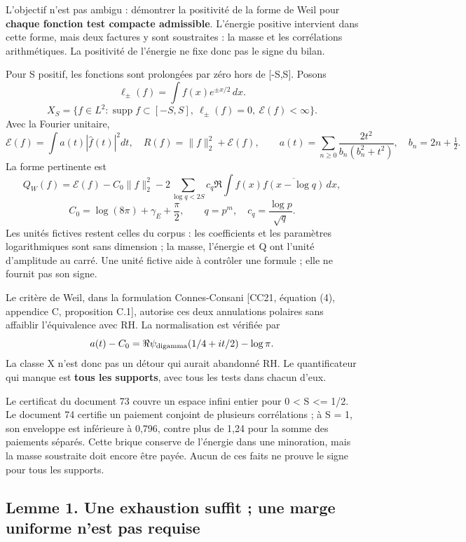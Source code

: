 \documentclass[
  10pt,
  a4paper,
]{article}
\begin{document}
L'objectif n'est pas ambigu : démontrer la positivité de la forme de
Weil pour \textbf{chaque fonction test compacte admissible}. L'énergie
positive intervient dans cette forme, mais deux factures y sont
soustraites : la masse et les corrélations arithmétiques. La positivité
de l'énergie ne fixe donc pas le signe du bilan.

Pour S positif, les fonctions sont prolongées par zéro hors de
{[}-S,S{]}. Posons \[
\ell_\pm(f)=\int f(x)e^{\pm x/2}\,dx.
\] \[
X_S=\{f\in L^2:\operatorname{supp}f\subset[-S,S],\ \ell_\pm(f)=0,\ \mathcal E(f)<\infty\}.
\] Avec la Fourier unitaire, \[
\mathcal E(f)=\int a(t)|\widehat f(t)|^2dt,\quad
R(f)=\|f\|_2^2+\mathcal E(f),\qquad
a(t)=\sum_{n\ge0}\frac{2t^2}{b_n(b_n^2+t^2)},\quad b_n=2n+\tfrac12.
\] La forme pertinente est \[
Q_W(f)=\mathcal E(f)-C_0\|f\|_2^2
-2\sum_{\log q<2S}c_q\Re\int f(x)\overline{f(x-\log q)}\,dx,
\] \[
C_0=\log(8\pi)+\gamma_E+\frac\pi2,\qquad
q=p^m,\quad c_q=\frac{\log p}{\sqrt q}.
\] Les unités fictives restent celles du corpus : les coefficients et
les paramètres logarithmiques sont sans dimension ; la masse, l'énergie
et Q ont l'unité d'amplitude au carré. Une unité fictive aide à
contrôler une formule ; elle ne fournit pas son signe.

Le critère de Weil, dans la formulation Connes-Consani {[}CC21, équation
(4), appendice C, proposition C.1{]}, autorise ces deux annulations
polaires sans affaiblir l'équivalence avec RH. La normalisation est
vérifiée par \[
a(t)-C_0=\Re\psi_{\rm digamma}(1/4+it/2)-\log\pi.
\] La classe X n'est donc pas un détour qui aurait abandonné RH. Le
quantificateur qui manque est \textbf{tous les supports}, avec tous les
tests dans chacun d'eux.

Le certificat du document 73 couvre un espace infini entier pour 0
\textless{} S \textless= 1/2. Le document 74 certifie un paiement
conjoint de plusieurs corrélations ; à S = 1, son enveloppe est
inférieure à 0,796, contre plus de 1,24 pour la somme des paiements
séparés. Cette brique conserve de l'énergie dans une minoration, mais la
masse soustraite doit encore être payée. Aucun de ces faits ne prouve le
signe pour tous les supports.

\hypertarget{lemme-1.-une-exhaustion-suffit-une-marge-uniforme-nest-pas-requise}{%
\subsection{Lemme 1. Une exhaustion suffit ; une marge uniforme n'est
pas
requise}\label{lemme-1.-une-exhaustion-suffit-une-marge-uniforme-nest-pas-requise}}
\end{document}
